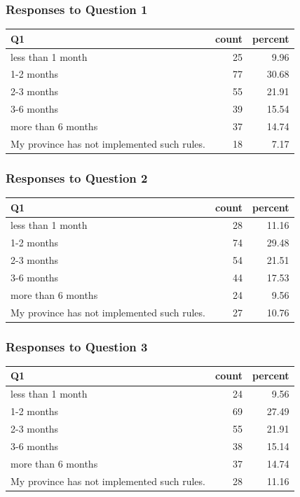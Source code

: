 \documentclass[
]{article}
\begin{document}
\hypertarget{responses-to-question-1}{%
\subsubsection{Responses to Question 1}\label{responses-to-question-1}}

\begin{longtable}[]{@{}lrr@{}}
\toprule
Q1 & count & percent \\
\midrule
\endhead
less than 1 month & 25 & 9.96 \\
1-2 months & 77 & 30.68 \\
2-3 months & 55 & 21.91 \\
3-6 months & 39 & 15.54 \\
more than 6 months & 37 & 14.74 \\
My province has not implemented such rules. & 18 & 7.17 \\
\bottomrule
\end{longtable}

\hypertarget{responses-to-question-2}{%
\subsubsection{Responses to Question 2}\label{responses-to-question-2}}

\begin{longtable}[]{@{}lrr@{}}
\toprule
Q1 & count & percent \\
\midrule
\endhead
less than 1 month & 28 & 11.16 \\
1-2 months & 74 & 29.48 \\
2-3 months & 54 & 21.51 \\
3-6 months & 44 & 17.53 \\
more than 6 months & 24 & 9.56 \\
My province has not implemented such rules. & 27 & 10.76 \\
\bottomrule
\end{longtable}

\hypertarget{responses-to-question-3}{%
\subsubsection{Responses to Question 3}\label{responses-to-question-3}}

\begin{longtable}[]{@{}lrr@{}}
\toprule
Q1 & count & percent \\
\midrule
\endhead
less than 1 month & 24 & 9.56 \\
1-2 months & 69 & 27.49 \\
2-3 months & 55 & 21.91 \\
3-6 months & 38 & 15.14 \\
more than 6 months & 37 & 14.74 \\
My province has not implemented such rules. & 28 & 11.16 \\
\bottomrule
\end{longtable}
\end{document}
